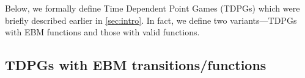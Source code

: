 \documentclass{article}
\begin{document}
%

%

%
%
%
%
%
%
%
%
%
%
%
%
%
%

%

%
%
%
%
%
%
%






%
Below, we formally define Time Dependent Point Games (TDPGs) which were briefly described earlier in \cref{sec:intro}. In fact, we define two variants---TDPGs with EBM functions and those with valid functions. %
%

\subsection{TDPGs with EBM transitions/functions\label{subsec:tdpgebm}}
\end{document}
